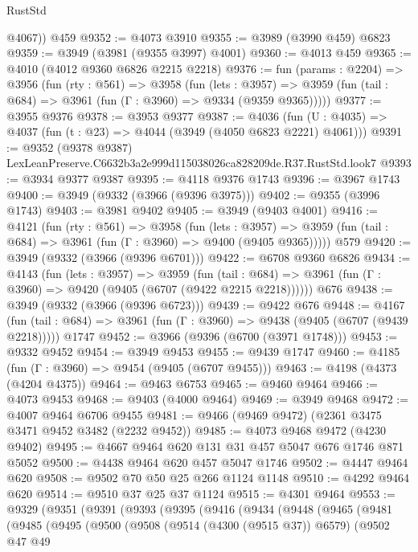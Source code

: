 \begin{lexlean}{RustStd}
\begin{coremodule}
        @4067))
    @459
@9352 := @4073 @3910
@9355 := @3989 (@3990 @459) @6823
@9359 := @3949 (@3981 (@9355 @3997) @4001)
@9360 := @4013 @459
@9365 := @4010 (@4012 @9360 @6826 @2215 @2218)
@9376 := fun (params : @2204) =>
  @3956
    (fun (rty : @561) =>
    @3958
      (fun (lets : @3957) =>
      @3959 (fun (tail : @684) => @3961 (fun (Γ : @3960) => @9334 (@9359 @9365)))))
@9377 := @3955 @9376
@9378 := @3953 @9377
@9387 := @4036 (fun (U : @4035) => @4037 (fun (t : @23) => @4044 (@3949 (@4050 @6823 @2221) @4061)))
@9391 := @9352 (@9378 @9387) LexLeanPreserve.C6632b3a2e999d115038026ca828209de.R37.RustStd.look7
@9393 := @3934 @9377 @9387
@9395 := @4118 @9376 @1743
@9396 := @3967 @1743
@9400 := @3949 (@9332 (@3966 (@9396 @3975)))
@9402 := @9355 (@3996 @1743)
@9403 := @3981 @9402
@9405 := @3949 (@9403 @4001)
@9416 := @4121
    (fun (rty : @561) =>
    @3958
      (fun (lets : @3957) =>
      @3959 (fun (tail : @684) => @3961 (fun (Γ : @3960) => @9400 (@9405 @9365)))))
    @579
@9420 := @3949 (@9332 (@3966 (@9396 @6701)))
@9422 := @6708 @9360 @6826
@9434 := @4143
    (fun (lets : @3957) =>
    @3959
      (fun (tail : @684) => @3961 (fun (Γ : @3960) => @9420 (@9405 (@6707 (@9422 @2215 @2218))))))
    @676
@9438 := @3949 (@9332 (@3966 (@9396 @6723)))
@9439 := @9422 @676
@9448 := @4167
    (fun (tail : @684) => @3961 (fun (Γ : @3960) => @9438 (@9405 (@6707 (@9439 @2218)))))
    @1747
@9452 := @3966 (@9396 (@6700 (@3971 @1748)))
@9453 := @9332 @9452
@9454 := @3949 @9453
@9455 := @9439 @1747
@9460 := @4185 (fun (Γ : @3960) => @9454 (@9405 (@6707 @9455)))
@9463 := @4198 (@4373 (@4204 @4375))
@9464 := @9463 @6753
@9465 := @9460 @9464
@9466 := @4073 @9453
@9468 := @9403 (@4000 @9464)
@9469 := @3949 @9468
@9472 := @4007 @9464 @6706 @9455
@9481 := @9466 (@9469 @9472) (@2361 @3475 @3471 @9452 @3482 (@2232 @9452))
@9485 := @4073 @9468 @9472 (@4230 @9402)
@9495 := @4667 @9464 @620 @131 @31 @457 @5047 @676 @1746 @871 @5052
@9500 := @4438 @9464 @620 @457 @5047 @1746
@9502 := @4447 @9464 @620
@9508 := @9502 @70 @50 @25 @266 @1124 @1148
@9510 := @4292 @9464 @620
@9514 := @9510 @37 @25 @37 @1124
@9515 := @4301 @9464
@9553 := @9329
    (@9351
      (@9391
        (@9393
          (@9395
            (@9416
              (@9434
                (@9448
                  (@9465
                    (@9481
                      (@9485
                        (@9495
                          (@9500
                            (@9508
                              (@9514 (@4300 (@9515 @37)) @6579)
                              (@9502
                                @47
                                @49

\end{coremodule}
\end{lexlean}

